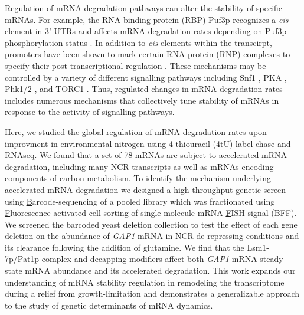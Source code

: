 Regulation of mRNA degradation pathways can alter the stability of
specific mRNAs. For example, the RNA-binding protein (RBP) Puf3p
recognizes a \textit{cis}-element in 3' UTRs \parencite{olivas2000puf3}
and affects mRNA degradation rates depending on
Puf3p phosphorylation status \parencite{lee2015glucose}. 
In addition to \textit{cis}-elements within the transcirpt, 
promoters have
been shown to mark certain RNA-protein (RNP) complexes to specify
their post-transcriptional regulation
\parencite{mercado1994levels,haimovich2013gene,trcek2011single,braun2016snf1}. These
mechanisms may be controlled by a variety of different signalling
pathways including Snf1
\parencite{young2012amp,braun2014phosphoproteomic}, PKA
\parencite{ramachandran2011camp}, Phk1/2 \parencite{luo2011nutrients}, and TORC1
\parencite{talarek2010initiation}. Thus, regulated changes in  mRNA degradation
rates includes numerous mechanisms that collectively tune stability of
mRNAs in response to the activity of signalling pathways. 

Here, we studied the global regulation of mRNA degradation rates upon
improvment in environmental nitrogen using 4-thiouracil (4tU) 
label-chase and RNAseq.
We found that a set of 78 mRNAs are subject to accelerated mRNA
degradation, including many NCR transcripts as well as mRNAs
encoding components of
carbon metabolism. To identify the mechanism underlying accelerated
mRNA degradation we designed a high-throughput genetic screen using 
\underline{B}arcode-sequencing of a pooled library which was
fractionated using \underline{F}luorescence-activated cell 
sorting of single molecule mRNA \underline{F}ISH signal (BFF). 
We screened the barcoded
yeast deletion collection to test the effect of each gene deletion
on the abundance of \textit{GAP1} mRNA in NCR de-repressing 
conditions and its clearance following the 
addition of glutamine. We
find that the Lsm1-7p/Pat1p complex and decapping modifiers affect
both \textit{GAP1} mRNA steady-state mRNA abundance and its 
accelerated degradation.
This work expands our
understanding of mRNA stability regulation in remodeling the
transcriptome during a relief from growth-limitation and demonstrates
a generalizable approach to the study of genetic determinants of mRNA
dynamics.



